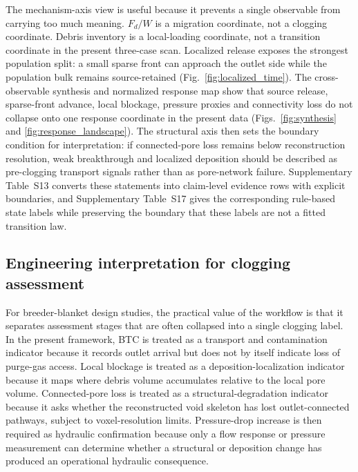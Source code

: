 \documentclass[preprint,12pt,authoryear]{elsarticle}
\newcommand{\FdW}{$F_d/W$\xspace}
\newcommand{\BTC}{BTC\xspace}
\begin{document}
The mechanism-axis view is useful because it prevents a single observable from carrying too much meaning. \FdW is a migration coordinate, not a clogging coordinate. Debris inventory is a local-loading coordinate, not a transition coordinate in the present three-case scan. Localized release exposes the strongest population split: a small sparse front can approach the outlet side while the population bulk remains source-retained (Fig.~\ref{fig:localized_time}). The cross-observable synthesis and normalized response map show that source release, sparse-front advance, local blockage, pressure proxies and connectivity loss do not collapse onto one response coordinate in the present data (Figs.~\ref{fig:synthesis} and \ref{fig:response_landscape}). The structural axis then sets the boundary condition for interpretation: if connected-pore loss remains below reconstruction resolution, weak breakthrough and localized deposition should be described as pre-clogging transport signals rather than as pore-network failure. Supplementary Table~S13 converts these statements into claim-level evidence rows with explicit boundaries, and Supplementary Table~S17 gives the corresponding rule-based state labels while preserving the boundary that these labels are not a fitted transition law.

\subsection{Engineering interpretation for clogging assessment}

For breeder-blanket design studies, the practical value of the workflow is that it separates assessment stages that are often collapsed into a single clogging label. In the present framework, \BTC is treated as a transport and contamination indicator because it records outlet arrival but does not by itself indicate loss of purge-gas access. Local blockage is treated as a deposition-localization indicator because it maps where debris volume accumulates relative to the local pore volume. Connected-pore loss is treated as a structural-degradation indicator because it asks whether the reconstructed void skeleton has lost outlet-connected pathways, subject to voxel-resolution limits. Pressure-drop increase is then required as hydraulic confirmation because only a flow response or pressure measurement can determine whether a structural or deposition change has produced an operational hydraulic consequence.
\end{document}
